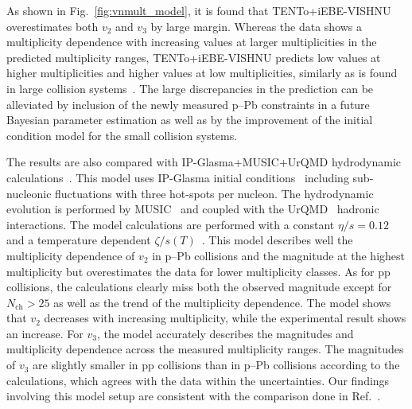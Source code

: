 As shown in Fig.~\ref{fig:vnmult_model}, it is found that {TENTo}+iEBE-VISHNU overestimates both $v_2$ and $v_3$ by large margin. Whereas the data shows a multiplicity dependence with increasing values at larger multiplicities in the predicted multiplicity ranges, {TENTo}+iEBE-VISHNU predicts low values at higher multiplicities and higher values at low multiplicities, similarly as is found in large collision systems~\cite{Acharya:2020taj}. The large discrepancies in the prediction can be alleviated by inclusion of the newly measured p--Pb constraints in a future Bayesian parameter estimation as well as by the improvement of the initial condition model for the small collision systems.

The results are also compared with IP-Glasma+MUSIC+UrQMD hydrodynamic calculations~\cite{Schenke:2020mbo}. This model uses IP-Glasma initial conditions~\cite{Schenke:2012wb} including sub-nucleonic fluctuations with three hot-spots per nucleon. The hydrodynamic evolution is performed by MUSIC~\cite{Schenke:2010rr} and coupled with the UrQMD~\cite{Bass:1998ca,Bleicher:1999xi} hadronic interactions. 
The model calculations are performed with a constant $\eta/s=0.12$ and a temperature dependent $\zeta/s(T)$~\cite{Rose:2020lfc}. 
This model describes well the multiplicity dependence of $v_2$ in p--Pb collisions and the magnitude at the highest multiplicity but overestimates the data for lower multiplicity classes. As for pp collisions, the calculations clearly miss both the observed magnitude except for $N_\mathrm{ch}>25$ as well as the trend of the multiplicity dependence. The model shows that $v_2$ decreases with increasing multiplicity, while the experimental result shows an increase.
For $v_3$, the model accurately describes the magnitudes and multiplicity dependence across the measured multiplicity ranges. The magnitudes of $v_3$ are slightly smaller in pp collisions than in p--Pb collisions according to the calculations, which agrees with the data within the uncertainties. Our findings involving this model setup are consistent with the comparison done in Ref.~\cite{Acharya:2019vdf}.


